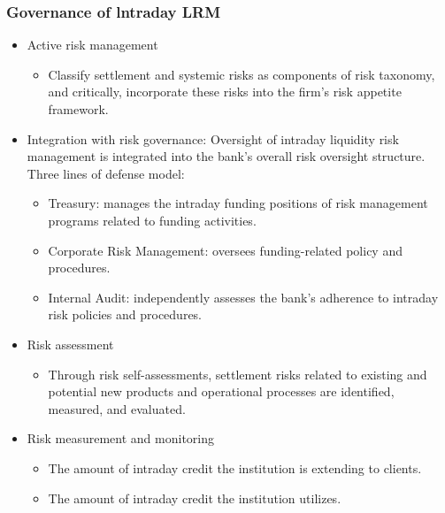\subsubsection{Governance of lntraday LRM}
\begin{itemize}
\item Active risk management
    \begin{itemize}
    \item Classify settlement and systemic risks as components of risk taxonomy, and critically, incorporate these risks into the firm's risk appetite framework.
    \end{itemize}
    
\item Integration with risk governance: Oversight of intraday liquidity risk management is integrated into the bank's overall risk oversight structure. Three lines of defense model:
    \begin{itemize}
    \item Treasury: manages the intraday funding positions of risk management programs related to funding activities.
    \item Corporate Risk Management: oversees funding-related policy and procedures.
    \item Internal Audit: independently assesses the bank's adherence to intraday risk policies and procedures.
    \end{itemize}
    
\item Risk assessment
    \begin{itemize}
    \item Through risk self-assessments, settlement risks related to existing and potential new products and operational processes are identified, measured, and evaluated.
    \end{itemize}
    
\item Risk measurement and monitoring
    \begin{itemize}
    \item The amount of intraday credit the institution is extending to clients.
    \item The amount of intraday credit the institution utilizes.
    \end{itemize}
    
\end{itemize}




